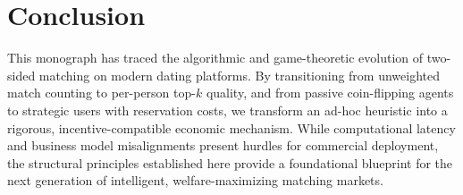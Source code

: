 \documentclass[11pt,letterpaper]{article}
\theoremstyle{definition}
\theoremstyle{plain}
\theoremstyle{remark}
\begin{document}
\section{Conclusion}
This monograph has traced the algorithmic and game-theoretic evolution of two-sided matching on modern dating platforms. By transitioning from unweighted match counting to per-person top-$k$ quality, and from passive coin-flipping agents to strategic users with reservation costs, we transform an ad-hoc heuristic into a rigorous, incentive-compatible economic mechanism. While computational latency and business model misalignments present hurdles for commercial deployment, the structural principles established here provide a foundational blueprint for the next generation of intelligent, welfare-maximizing matching markets.
\end{document}
